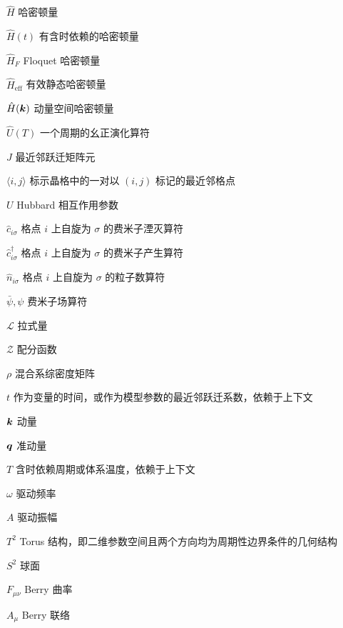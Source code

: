 \begin{denotation}[3cm]
\item[$\hat{H}$] 哈密顿量
\item[$\hat{H}(t)$] 有含时依赖的哈密顿量
\item[$\hat{H}_F$] Floquet 哈密顿量
\item[$\hat{H}_{\text{eff}}$] 有效静态哈密顿量
\item[$\hat{H}(\boldsymbol{k})$] 动量空间哈密顿量
\item[$\hat{U}(T)$] 一个周期的幺正演化算符
\item[$J$] 最近邻跃迁矩阵元
\item[$\langle i,j\rangle$] 标示晶格中的一对以 $(i,j)$ 标记的最近邻格点
\item[$U$] Hubbard 相互作用参数
\item[$\hat{c}_{i\sigma}$] 格点 $i$ 上自旋为 $\sigma$ 的费米子湮灭算符
\item[$\hat{c}^{\dagger}_{i\sigma}$] 格点 $i$ 上自旋为 $\sigma$ 的费米子产生算符
\item[$\hat{n}_{i\sigma}$] 格点 $i$ 上自旋为 $\sigma$ 的粒子数算符
\item[$\bar\psi, \psi$] 费米子场算符
\item[$\mathcal{L}$] 拉式量
\item[$\mathcal{Z}$] 配分函数
\item[$\rho$] 混合系综密度矩阵
\item[$t$] 作为变量的时间，或作为模型参数的最近邻跃迁系数，依赖于上下文
\item[$\boldsymbol{k}$] 动量
\item[$\boldsymbol{q}$] 准动量
\item[$T$] 含时依赖周期或体系温度，依赖于上下文
\item[$\omega$] 驱动频率
\item[$A$] 驱动振幅
\item[$T^2$] Torus 结构，即二维参数空间且两个方向均为周期性边界条件的几何结构
\item[$S^2$] 球面
\item[$F_{\mu\nu}$] Berry 曲率
\item[$A_{\mu}$] Berry 联络
\end{denotation}





